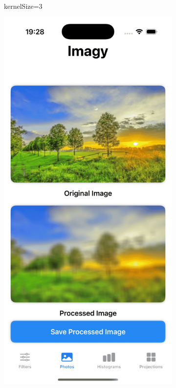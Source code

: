 \documentclass[a4paper]{article}
\begin{document}
\begin{itemize}
\begin{figure}[H]
\begin{subfigure}{0.2\textwidth}
                  \caption{kernelSize=3}
                  \label{fig:trees_averaging_3}
              \end{subfigure}
              \hfill
              \begin{subfigure}{0.2\textwidth}
                  \centering
                  \includegraphics[width=\linewidth]{images/trees_averaging_21.png}

\end{subfigure}
\end{figure}
\end{itemize}
\end{document}
